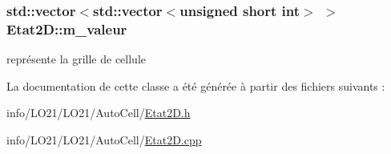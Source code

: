 \subsubsection[{\texorpdfstring{m\+\_\+valeur}{m_valeur}}]{\setlength{\rightskip}{0pt plus 5cm}std\+::vector$<$std\+::vector$<$unsigned short int$>$ $>$ Etat2\+D\+::m\+\_\+valeur\hspace{0.3cm}{\ttfamily [protected]}}\hypertarget{class_etat2_d_a82d1c6326dedc79f902c1782d6a10cfb}{}\label{class_etat2_d_a82d1c6326dedc79f902c1782d6a10cfb}
représente la grille de cellule 

La documentation de cette classe a été générée à partir des fichiers suivants \+:\begin{DoxyCompactItemize}
\item 
info/\+L\+O21/\+L\+O21/\+Auto\+Cell/\hyperlink{_etat2_d_8h}{Etat2\+D.\+h}\item 
info/\+L\+O21/\+L\+O21/\+Auto\+Cell/\hyperlink{_etat2_d_8cpp}{Etat2\+D.\+cpp}\end{DoxyCompactItemize}
